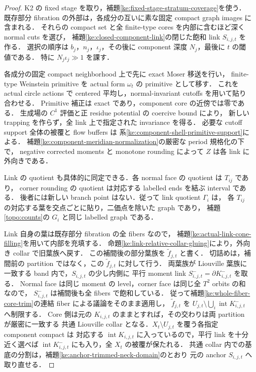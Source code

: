 \begin{proof}
K2 の fixed stage を取り，補題\ref{ke:fixed-stage-stratum-coverage}を使う．
既存部分 fibration の外部は，各成分の互いに素な固定 compact graph images に含まれる．
それらの compact set と全 finite-type cores を内部に含むほど深く normal cuts を選び，
補題\ref{ke:closed-component-link}の閉じた飽和 link $S_{i,j,t}$ を作る．
選択の順序は $b_j$，$n_j$，$\iota_j$，その後に component 深度 $N_j$，最後に $t$ の閾値である．
特に $N_j\iota_j\gg1$ を課す．

各成分の固定 compact neighborhood 上で先に exact Moser 移送を行い，
finite-type Weinstein primitive を actual form $\omega_t$ の primitive として移す．
これを actual circle actions で centered 平均し，normal-invariant cutoffs を用いて貼り合わせる．
Primitive 補正は exact であり，component core の近傍では零である．
生成場の $C^1$ 評価と正 residue potential の coercive bound により，
新しい trapping を作らず，全 link 上で指定された invariance を得る．
必要な cutoff support 全体の被覆と flow buffers は
系\ref{ke:component-shell-primitive-support}による．
補題\ref{ke:component-meridian-normalization}の厳密な period 規格化の下で，
negative corrected moments と monotone rounding によって $Z$ は各 link に外向きである．

Link の quotient も具体的に同定できる．各 normal face の quotient は $T_{ij}$ であり，
corner rounding の quotient は対応する labelled ends を結ぶ interval である．
後者には新しい branch point はない．従って link quotient $\Gamma_i$ は，
各 $T_{ij}$ の対応する葉を交点ごとに貼り，二価点を除いた graph であり，
補題\ref{topo:counts}の $G_i$ と同じ labelled graph である．

Link 自身の葉は既存部分 fibration の全 fibers なので，
補題\ref{ke:actual-link-cone-filling}を用いて内部を充填する．
命題\ref{ke:link-relative-collar-gluing}により，外向き collar で旧葉族へ戻す．
この補間後の部分葉族を $\widetilde f_{j,t}$ と書く．
切詰めは，補間前の partition ではなく，この $\widetilde f_{j,t}$ に対して行う．
両葉族が Liouville 葉族に一致する band 内で，$S_{i,j,t}$ の少し内側に
平行 moment link $S^-_{i,j,t}=\partial K^-_{i,j,t}$ を取る．
Normal face は同じ moment の level，corner face は同じ全 $T^2$ orbits の和なので，
$S^-_{i,j,t}$ は補間後も全 fibers で飽和している．
従って補題\ref{ke:whole-fiber-core-trim}の連結 fiber による議論をそのまま適用し，
$\widetilde f_{j,t}$ を
$U_{j,t}\setminus\bigcup_i\operatorname{int}K^-_{i,j,t}$ へ制限する．
Core 側は元の $K_{i,j,t}$ のままとすれば，その交わりは両 partition が厳密に一致する
共通 Liouville collar となる．$X_t\setminus U_{j,t}$ を覆う各指定 component compact は
対応する $\operatorname{int}K_{i,j,t}$ に入っているので，平行 link を十分近く選べば
$\operatorname{int}K^-_{i,j,t}$ にも入り，全 $X_t$ の被覆が保たれる．
共通 collar 内での基底の分割は，補題\ref{ke:anchor-trimmed-neck-domain}のとおり
元の anchor $S_{i,j,t}$ へ取り直せる．


\end{proof}
